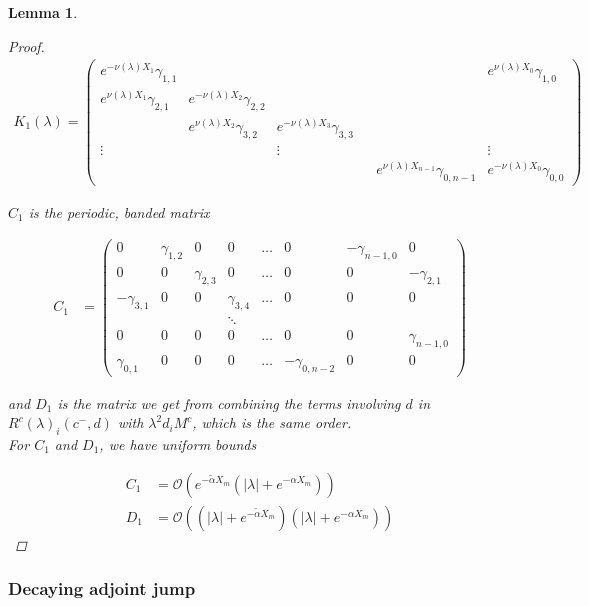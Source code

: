 \documentclass[12pt]{article}
\newtheorem{lemma}{Lemma}
\begin{document}
\begin{lemma}
\begin{proof}
\begin{align*}
K_1(\lambda) =  
\begin{pmatrix}
e^{-\nu(\lambda)X_1} \gamma_{1,1} & & & & & e^{\nu(\lambda)X_0}\gamma_{1,0} \\
e^{\nu(\lambda)X_1}\gamma_{2,1} & e^{-\nu(\lambda)X_2}\gamma_{2,2} \\
& e^{\nu(\lambda)X_2}\gamma_{3,2} & e^{-\nu(\lambda)X_3}\gamma_{3,3} \\
\vdots & & \vdots & &&  \vdots \\
& & & & e^{\nu(\lambda)X_{n-1}}\gamma_{0,n-1} & e^{-\nu(\lambda)X_0}\gamma_{0,0} 
\end{pmatrix}
\end{align*}

$C_1$ is the periodic, banded matrix

\begin{align*}
C_1 &= \begin{pmatrix}
0 & \gamma_{1,2} & 0 & 0 & \dots & 0 & -\gamma_{n-1,0} & 0 \\
0 & 0 & \gamma_{2,3} & 0 & \dots & 0 & 0 & -\gamma_{2,1} \\
-\gamma_{3,1} & 0 & 0 & \gamma_{3,4} & \dots & 0 & 0 & 0 \\
&  & & \ddots  \\
0 & 0 & 0 & 0 & \dots & 0 & 0 & \gamma_{n-1,0} \\
\gamma_{0,1} & 0 & 0 & 0 & \dots & -\gamma_{0, n-2} & 0 & 0 
\end{pmatrix}
\end{align*}

and $D_1$ is the matrix we get from combining the terms involving $d$ in $R^c(\lambda)_i(c^-, d)$ with $\lambda^2 d_i M^c$, which is the same order.\\

For $C_1$ and $D_1$, we have uniform bounds

\begin{align*}
C_1 &= \mathcal{O}(e^{-\tilde{\alpha} X_m}(|\lambda| + e^{-\alpha X_m})) \\
D_1 &= \mathcal{O}((|\lambda| + e^{-\tilde{\alpha} X_m})(|\lambda| + e^{-\alpha X_m}))
\end{align*}

\end{proof}
\end{lemma}

\subsubsection{Decaying adjoint jump}
\end{document}
